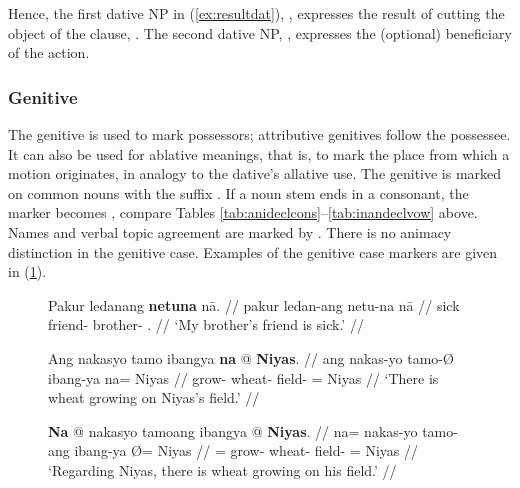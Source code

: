 Hence, the first dative NP in (\ref{ex:resultdat}),
, expresses the result of cutting
the object of the clause, . The second dative
NP, , expresses the (optional) beneficiary
of the action.


\subsubsection{Genitive}
\label{subsubsec:genitive}

The genitive is used to mark possessors; attributive genitives follow the
possessee. It can also be used for ablative meanings, that is, to mark the
place from which a motion originates, in analogy to the dative's allative use.
The genitive is marked on common nouns with the suffix . If a
noun stem ends in a consonant, the marker becomes , compare
Tables \ref{tab:anideclcons}--\ref{tab:inandeclvow} above. Names and verbal
topic agreement are marked by . There is no animacy distinction in
the genitive case. Examples of the genitive case markers are given in
(\ref{ex:genmarking}).

\begin{figure}[h]
\pex\label{ex:genmarking}
\a\begingl
	\gla Pakur ledanang \textbf{netuna} nā. //
	\glb pakur ledan-ang netu-na nā //
	\glc sick friend-\Aarg{} brother-\Gen{} \Fsg{}.\Gen{} //
	\glft `My brother's friend is sick.' //
\endgl


\a\begingl
	\gla Ang nakasyo tamo ibangya \textbf{na} @ \textbf{Niyas}. //
	\glb ang nakas-yo tamo-Ø ibang-ya na= Niyas //
	\glc \AgtT{} grow-\TsgN{} wheat-\Top{} field-\Loc{} \Gen{}= Niyas //
	\glft `There is wheat growing on Niyas's field.' //
\endgl

\a\begingl
	\gla \textbf{Na} @ nakasyo tamoang ibangya {} @ \textbf{Niyas}. //
	\glb na= nakas-yo tamo-ang ibang-ya Ø= Niyas //
	\glc \GenT{}= grow-\TsgN{} wheat-\Aarg{} field-\Loc{} \Top{}= Niyas //
	\glft `Regarding Niyas, there is wheat growing on his field.' //
\endgl
\xe
\end{figure}

